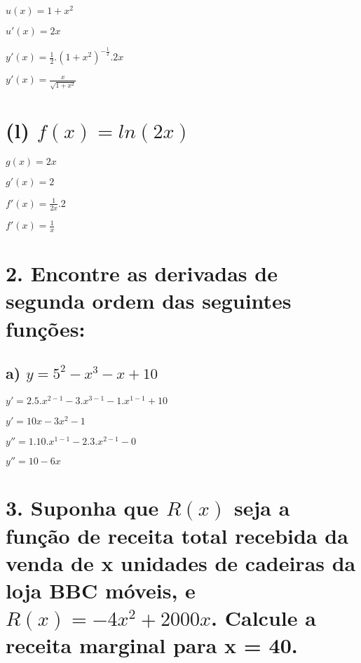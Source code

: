 \(u(x) = 1 + x^2\)

\(u'(x) = 2x\)

\(y'(x) = \frac{1}{2}.(1+x^2)^{-\frac{1}{2}}.2x\)

\(y'(x) = \frac{x}{\sqrt{1+x^2}}\)

\hypertarget{l-fx-ln2x}{%
\section{\texorpdfstring{(l)
\(f(x) = ln(2x)\)}{(l) f(x) = ln(2x)}}\label{l-fx-ln2x}}

\(g(x)=2x\)

\(g'(x)=2\)

\(f'(x) = \frac{1}{2x}.2\)

\(f'(x) = \frac{1}{x}\)

\hypertarget{encontre-as-derivadas-de-segunda-ordem-das-seguintes-funuxe7uxf5es}{%
\section{2. Encontre as derivadas de segunda ordem das seguintes
funções:}\label{encontre-as-derivadas-de-segunda-ordem-das-seguintes-funuxe7uxf5es}}

\hypertarget{a-y-52---x3---x-10}{%
\subsection{\texorpdfstring{a)
\(y = 5^2 - x^3 - x + 10\)}{a) y = 5\^{}2 - x\^{}3 - x + 10}}\label{a-y-52---x3---x-10}}

\(y'=2.5.x^{2-1} - 3.x^{3-1} - 1.x^{1-1} + 10\)

\(y'=10x-3x^2-1\)

\(y''=1.10.x^{1-1}-2.3.x^{2-1}-0\)

\(y''=10-6x\)

\hypertarget{suponha-que-rx-seja-a-funuxe7uxe3o-de-receita-total-recebida-da-venda-de-x-unidades-de-cadeiras-da-loja-bbc-muxf3veis-e-rx-4x22000x.-calcule-a-receita-marginal-para-x-40.}{%
\section{\texorpdfstring{3. Suponha que \(R(x)\) seja a função de
receita total recebida da venda de x unidades de cadeiras da loja BBC
móveis, e \(R(x)=-4x^2+2000x\). Calcule a receita marginal para x =
40.}{3. Suponha que R(x) seja a função de receita total recebida da venda de x unidades de cadeiras da loja BBC móveis, e R(x)=-4x\^{}2+2000x. Calcule a receita marginal para x = 40.}}\label{suponha-que-rx-seja-a-funuxe7uxe3o-de-receita-total-recebida-da-venda-de-x-unidades-de-cadeiras-da-loja-bbc-muxf3veis-e-rx-4x22000x.-calcule-a-receita-marginal-para-x-40.}}

